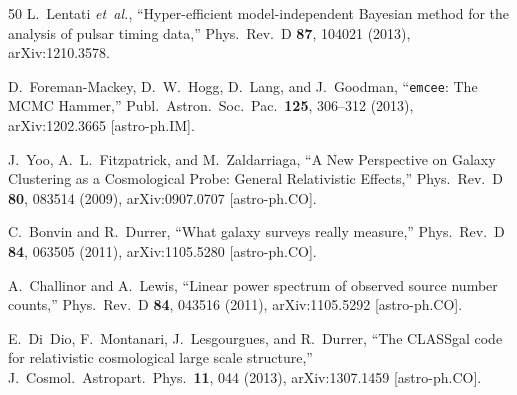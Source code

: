 \documentclass[aps,prd,twocolumn,superscriptaddress,showpacs,preprintnumbers,nofootinbib,longbibliography,floatfix]{revtex4-2}
\newcommand{\etal}{\textit{et~al.}}
\begin{document}
\begin{thebibliography}{50}
L.\ Lentati \etal,
``Hyper-efficient model-independent Bayesian method for the analysis of pulsar timing data,''
Phys.\ Rev.\ D \textbf{87}, 104021 (2013), arXiv:1210.3578.

D.\ Foreman-Mackey, D.~W.\ Hogg, D.\ Lang, and J.\ Goodman,
``\texttt{emcee}: The MCMC Hammer,''
Publ.\ Astron.\ Soc.\ Pac.\ \textbf{125}, 306--312 (2013), arXiv:1202.3665 [astro-ph.IM].

J.\ Yoo, A.\ L.\ Fitzpatrick, and M.\ Zaldarriaga,
``A New Perspective on Galaxy Clustering as a Cosmological Probe: General Relativistic Effects,''
Phys.\ Rev.\ D \textbf{80}, 083514 (2009), arXiv:0907.0707 [astro-ph.CO].

C.\ Bonvin and R.\ Durrer,
``What galaxy surveys really measure,''
Phys.\ Rev.\ D \textbf{84}, 063505 (2011), arXiv:1105.5280 [astro-ph.CO].

A.\ Challinor and A.\ Lewis,
``Linear power spectrum of observed source number counts,''
Phys.\ Rev.\ D \textbf{84}, 043516 (2011), arXiv:1105.5292 [astro-ph.CO].

E.\ Di~Dio, F.\ Montanari, J.\ Lesgourgues, and R.\ Durrer,
``The CLASSgal code for relativistic cosmological large scale structure,''
J.\ Cosmol.\ Astropart.\ Phys.\ \textbf{11}, 044 (2013), arXiv:1307.1459 [astro-ph.CO].

\end{thebibliography}
\end{document}
